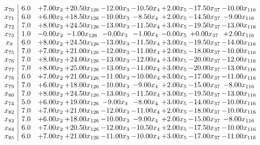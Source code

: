 \documentclass[8pt]{article}
\begin{document}
\[\begin{array}{c| c c@{\hskip 2pt} c@{\hskip 2pt} c@{\hskip 2pt} c@{\hskip 2pt} c@{\hskip 2pt} c@{\hskip 2pt} c@{\hskip 2pt} }
 x_{70}   &  6.0 & +  7.00 x_{2} & + 20.50 x_{126} & -12.00 x_{3} & -10.50 x_{4} & +  2.00 x_{5} & -17.50 x_{37} & -10.00 x_{116}\\
 x_{71}   &  6.0 & +  6.00 x_{2} & + 18.50 x_{126} & -10.00 x_{3} & -8.50 x_{4} & +  2.00 x_{5} & -14.50 x_{37} & -9.00 x_{116}\\
 x_{72}   &  7.0 & +  8.00 x_{2} & + 24.50 x_{126} & -13.00 x_{3} & -11.50 x_{4} & +  3.00 x_{5} & -19.50 x_{37} & -13.00 x_{116}\\
 x_{73}   &  1.0 & -0.00 x_{2} & -1.00 x_{126} & -0.00 x_{3} & -1.00 x_{4} & -0.00 x_{5} & +  0.00 x_{37} & +  2.00 x_{116}\\
 x_{8}   &  6.0 & +  8.00 x_{2} & + 24.50 x_{126} & -13.00 x_{3} & -11.50 x_{4} & +  3.00 x_{5} & -19.50 x_{37} & -14.00 x_{116}\\
 x_{75}   &  7.0 & +  7.00 x_{2} & + 21.00 x_{126} & -12.00 x_{3} & -11.00 x_{4} & +  2.00 x_{5} & -18.00 x_{37} & -10.00 x_{116}\\
 x_{76}   &  7.0 & +  8.00 x_{2} & + 24.00 x_{126} & -13.00 x_{3} & -12.00 x_{4} & +  3.00 x_{5} & -20.00 x_{37} & -12.00 x_{116}\\
 x_{77}   &  7.0 & +  8.00 x_{2} & + 25.00 x_{126} & -13.00 x_{3} & -11.00 x_{4} & +  3.00 x_{5} & -20.00 x_{37} & -13.00 x_{116}\\
 x_{78}   &  6.0 & +  7.00 x_{2} & + 21.00 x_{126} & -11.00 x_{3} & -10.00 x_{4} & +  3.00 x_{5} & -17.00 x_{37} & -11.00 x_{116}\\
 x_{79}   &  7.0 & +  6.00 x_{2} & + 18.00 x_{126} & -10.00 x_{3} & -9.00 x_{4} & +  2.00 x_{5} & -15.00 x_{37} & -8.00 x_{116}\\
 x_{80}   &  7.0 & +  8.00 x_{2} & + 24.50 x_{126} & -13.00 x_{3} & -11.50 x_{4} & +  3.00 x_{5} & -19.50 x_{37} & -13.00 x_{116}\\
 x_{74}   &  5.0 & +  6.00 x_{2} & + 19.00 x_{126} & -9.00 x_{3} & -8.00 x_{4} & +  3.00 x_{5} & -14.00 x_{37} & -10.00 x_{116}\\
 x_{82}   &  7.0 & +  7.00 x_{2} & + 21.00 x_{126} & -12.00 x_{3} & -11.00 x_{4} & +  2.00 x_{5} & -18.00 x_{37} & -10.00 x_{116}\\
 x_{83}   &  7.0 & +  6.00 x_{2} & + 18.00 x_{126} & -10.00 x_{3} & -9.00 x_{4} & +  2.00 x_{5} & -15.00 x_{37} & -8.00 x_{116}\\
 x_{84}   &  6.0 & +  7.00 x_{2} & + 20.50 x_{126} & -12.00 x_{3} & -10.50 x_{4} & +  2.00 x_{5} & -17.50 x_{37} & -10.00 x_{116}\\
 x_{85}   &  6.0 & +  7.00 x_{2} & + 21.00 x_{126} & -11.00 x_{3} & -10.00 x_{4} & +  3.00 x_{5} & -17.00 x_{37} & -11.00 x_{116}\\

\end{array}\]
\end{document}
